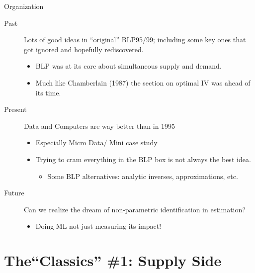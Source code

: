 \documentclass[aspectratio=169,10pt]{beamer}
\begin{document}
\begin{frame}{Organization}
    \begin{description}
        \item[Past] Lots of good ideas in ``original'' BLP95/99; including some key ones that got ignored and hopefully rediscovered.
        \begin{itemize}
            \item BLP was at its core about \alert{simultaneous supply and demand}.
            \item Much like Chamberlain (1987) the section on optimal IV was ahead of its time.
        \end{itemize}
        \item[Present] Data and Computers are way better than in 1995
        \begin{itemize}
            \item Especially \alert{Micro Data}/ Mini case study
            \item Trying to cram everything in the BLP box is not always the best idea. 
            \begin{itemize}
                \item Some BLP alternatives: analytic inverses, approximations, etc.
            \end{itemize}
        \end{itemize}
        \item[Future] Can we realize the dream of \alert{non-parametric identification} in \alert{estimation}?
            \begin{itemize}
                \item Doing ML not just measuring its impact!
            \end{itemize}
    \end{description}
\end{frame}


\section*{The``Classics'' \#1: Supply Side}
\end{document}
